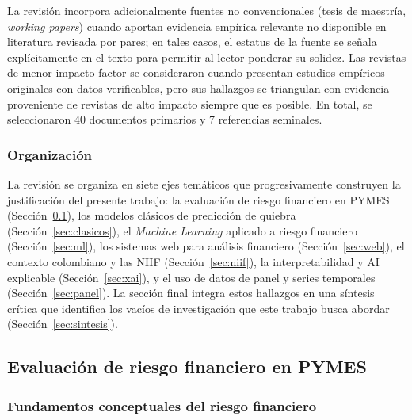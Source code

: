 \documentclass[12pt, letterpaper]{article}
\begin{document}
La revisi\'on incorpora adicionalmente fuentes no convencionales (tesis de maestr\'ia, \textit{working papers}) cuando aportan evidencia emp\'irica relevante no disponible en literatura revisada por pares; en tales casos, el estatus de la fuente se se\~nala expl\'icitamente en el texto para permitir al lector ponderar su solidez. Las revistas de menor impacto factor se consideraron cuando presentan estudios emp\'iricos originales con datos verificables, pero sus hallazgos se triangulan con evidencia proveniente de revistas de alto impacto siempre que es posible. En total, se seleccionaron 40 documentos primarios y 7 referencias seminales.

\subsubsection*{Organizaci\'on}

La revisi\'on se organiza en siete ejes tem\'aticos que progresivamente construyen la justificaci\'on del presente trabajo: la evaluaci\'on de riesgo financiero en PYMES (Secci\'on~\ref{sec:riesgo}), los modelos cl\'asicos de predicci\'on de quiebra (Secci\'on~\ref{sec:clasicos}), el \textit{Machine Learning} aplicado a riesgo financiero (Secci\'on~\ref{sec:ml}), los sistemas web para an\'alisis financiero (Secci\'on~\ref{sec:web}), el contexto colombiano y las NIIF (Secci\'on~\ref{sec:niif}), la interpretabilidad y AI explicable (Secci\'on~\ref{sec:xai}), y el uso de datos de panel y series temporales (Secci\'on~\ref{sec:panel}). La secci\'on final integra estos hallazgos en una s\'intesis cr\'itica que identifica los vac\'ios de investigaci\'on que este trabajo busca abordar (Secci\'on~\ref{sec:sintesis}).

\subsection{Evaluaci\'on de riesgo financiero en PYMES}
\label{sec:riesgo}

\subsubsection{Fundamentos conceptuales del riesgo financiero}
\end{document}

